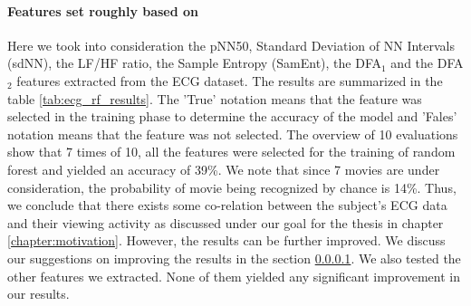 \paragraph{Features set roughly based on \citeauthor{zhao_emotion_2016}} Here we took into consideration the pNN50, Standard Deviation of NN Intervals (sdNN), the LF/HF ratio, the Sample Entropy (SamEnt), the DFA$_{1}$ and the DFA$_{2}$ features extracted from the ECG dataset. The results are summarized in the table \ref{tab:ecg_rf_results}. The 'True' notation means that the feature was selected in the training phase to determine the accuracy of the model and 'Fales' notation means that the feature was not selected. The overview of 10 evaluations show that 7 times of 10, all the features were selected for the training of random forest and yielded an accuracy of 39\%. We note that since 7 movies are under consideration, the probability of movie being recognized by chance is 14\%. Thus, we conclude that there exists some co-relation between the subject's ECG data and their viewing activity as discussed under our goal for the thesis in chapter \ref{chapter:motivation}. However, the results can be further improved. We discuss our suggestions on improving the results in the section \ref{}. We also tested the other features we extracted. None of them yielded any significant improvement in our results.

